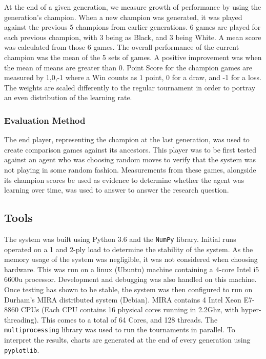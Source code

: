 \documentclass[12pt,a4paper]{article}
\newcommand{\inlinecode}[2]{\colorbox{white}{\fontsize{10}{10}\lstinline[language=#1]$#2$}}
\begin{document}
        At the end of a given generation, we measure growth of performance by using the generation's champion. When a new champion was generated, it was played against the previous 5 champions from earlier generations. 6 games are played for each previous champion, with 3 being as Black, and 3 being White. A mean score was calculated from those 6 games. The overall performance of the current champion was the mean of the 5 sets of games. A positive improvement was when the mean of means are greater than 0. Point Score for the champion games are measured by {1,0,-1} where a Win counts as 1 point, 0 for a draw, and -1 for a loss. The weights are scaled differently to the regular tournament in order to portray an even distribution of the learning rate.
    
        \subsubsection*{Evaluation Method}
    
        The end player, representing the champion at the last generation, was used to create comparison games against its ancestors. This player was to be first tested against an agent who was choosing random moves to verify that the system was not playing in some random fashion. Measurements from these games, alongside its champion scores be used as evidence to determine whether the agent was learning over time, was used to answer to answer the research question.
       
    \subsection{Tools}
        The system was built using Python 3.6 and the \inlinecode{Python}{NumPy} library. Initial runs operated on a 1 and 2-ply load to determine the stability of the system. As the memory usage of the system was negligible, it was not considered when choosing hardware. This was run on a linux (Ubuntu) machine containing a 4-core Intel i5 6600u processor. Development and debugging was also handled on this machine. Once testing has shown to be stable, the system was then configured to run on Durham's MIRA distributed system (Debian). MIRA contains 4 Intel Xeon E7-8860 CPUs (Each CPU contains 16 physical cores running in 2.2Ghz, with hyper-threading). This comes to a total of 64 Cores, and 128 threads. The \inlinecode{Python}{multiprocessing} library was used to run the tournaments in parallel. To interpret the results, charts are generated at the end of every generation using \inlinecode{Python}{pyplotlib}.
        
\end{document}
